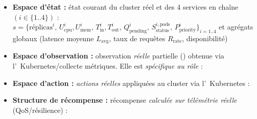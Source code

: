 \begin{itemize}
  \item \textbf{Espace d'état :} état courant du cluster réel et des 4 services en chaîne \((i \in \{1..4\})\) :
        \(
        s = \{\text{réplicas}^i,\,
        U_{\text{cpu}}^i, U_{\text{mem}}^i,\,
        T_{\text{in}}^i, T_{\text{out}}^i,\,
        Q_{\text{pending}}^i,\,
        S_{\text{status}}^{i,\text{pods}},\,
        P_{\text{priority}}^i\}_{i=1..4}
        \)
        et agrégats globaux (latence moyenne \(L_{\text{avg}}\), taux de requêtes \(R_{\text{rate}}\), disponibilité)
  \item \textbf{Espace d'observation :} observation \emph{réelle} partielle () obtenue via l'~Kubernetes/collecte métriques. Elle est \emph{spécifique au rôle} :
  \item \textbf{Espace d'action :} \emph{actions réelles} appliquées au cluster via l'~Kubernetes :
  \item \textbf{Structure de récompense :} récompense \emph{calculée sur télémétrie réelle} (QoS/résilience) :

\end{itemize}
